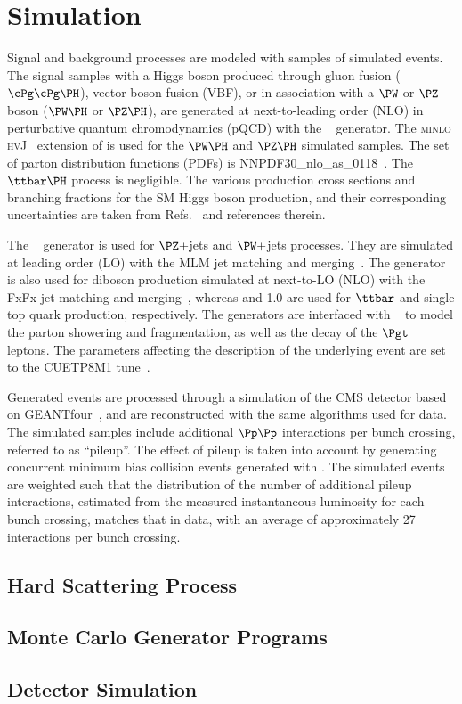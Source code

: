 \chapter{Simulation}
\label{sec:simulation}

Signal and background processes are modeled with samples of simulated events.
The signal samples with a Higgs boson produced through gluon fusion ($\cPg\cPg\PH$), vector boson fusion (VBF),
or in association with a $\PW$ or $\PZ$ boson ($\PW\PH$ or $\PZ\PH$), are generated at next-to-leading order (NLO) in perturbative quantum chromodynamics (pQCD) with the ~\cite{Nason:2004rx,Frixione:2007vw, Alioli:2010xd, Alioli:2010xa, Alioli:2008tz} generator. The \textsc{minlo hvJ}~\cite{Luisoni:2013kna} extension of  is used for the $\PW\PH$ and $\PZ\PH$ simulated samples. The set of parton distribution functions (PDFs) is NNPDF30\_nlo\_as\_0118~\cite{Ball:2011uy}. The $\ttbar\PH$ process is negligible.
The various production cross sections and branching fractions for the SM Higgs boson production, and their corresponding uncertainties are taken from Refs.~\cite{deFlorian:2016spz,Denner:2011mq,Ball:2011mu} and references therein.

The \aMCATNLO~\cite{Alwall:2014hca} generator is used for $\PZ+$jets and $\PW+$jets processes. They are simulated at leading order (LO) with the MLM jet matching and merging~\cite{Alwall:2007fs}.
The \aMCATNLO generator is also used for diboson production simulated at next-to-LO (NLO) with the FxFx jet matching and merging~\cite{Frederix:2012ps}, whereas  and 1.0 are used for $\ttbar$ and single top quark production, respectively.
The generators are interfaced with  ~\cite{Sjostrand:2014zea} to model the parton showering and fragmentation, as well as the decay of the $\Pgt$ leptons.
The \PYTHIA parameters affecting the description of the underlying event are set to the {CUETP8M1} tune~\cite{Khachatryan:2015pea}.

Generated events are processed through a simulation of the CMS detector based on
GEANTfour~\cite{Agostinelli:2002hh}, and are reconstructed with the same algorithms used for data.
The simulated samples include additional $\Pp\Pp$ interactions per bunch
crossing, referred to as ``pileup''.
The effect of pileup is taken into account by generating concurrent minimum bias collision events generated with \PYTHIA.
The simulated events are weighted such that the distribution of the number of additional pileup interactions, estimated from the measured instantaneous luminosity for each bunch crossing, matches that in data, with an average of approximately 27 interactions per bunch crossing.

\section{Hard Scattering Process}
\section{Monte Carlo Generator Programs}
\section{Detector Simulation}


